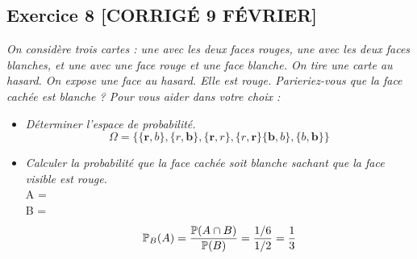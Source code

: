 \subsection*{Exercice 8 [CORRIGÉ 9 FÉVRIER]}
\textit{On considère trois cartes : une avec les deux faces rouges, une avec les deux faces blanches, et une avec une face rouge et une face blanche. On tire une carte au hasard. On expose une face au hasard. Elle est rouge. Parieriez-vous que la face cachée est blanche ? Pour vous aider dans votre choix :}
\begin{itemize}
    \item \textit{Déterminer l’espace de probabilité.}
    \begin{equation*}
        \Omega = \{\{\textbf{r}, b\}, \{r, \textbf{b}\}, \{\textbf{r},r\}, \{r,\textbf{r}\} \{\textbf{b}, b\}, \{b, \textbf{b}\}\}
    \end{equation*}
    \item \textit{Calculer la probabilité que la face cachée soit blanche sachant que la face visible est rouge.}\\
    A =  \\
    B = \\
    \begin{equation*}
        \mathbb{P}_B(A) = \frac{\mathbb{P}(A \cap B)}{\mathbb{P}(B)} = \frac{1/6}{1/2} = \frac{1}{3}
    \end{equation*}
\end{itemize}